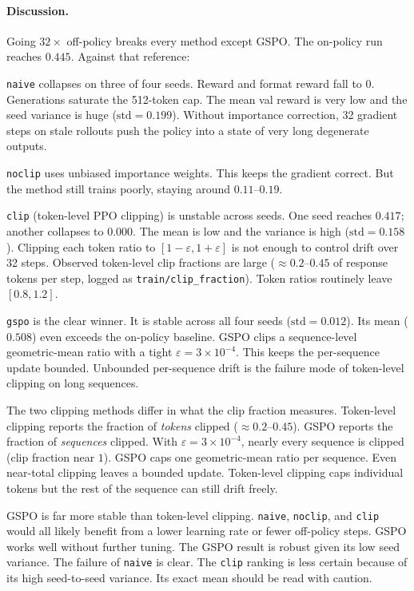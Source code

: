 \documentclass[11pt]{article}
\newcommand{\std}{\mathrm{std}}
\begin{document}
\paragraph{Discussion.}
Going $32\times$ off-policy breaks every method except GSPO. The on-policy run
reaches $0.445$. Against that reference:

\texttt{naive} collapses on three of four seeds. Reward and format reward fall
to $0$. Generations saturate the 512-token cap. The mean val reward is very low
and the seed variance is huge ($\std=0.199$). Without importance correction,
32 gradient steps on stale rollouts push the policy into a state of very long
degenerate outputs.

\texttt{noclip} uses unbiased importance weights. This keeps the gradient
correct. But the method still trains poorly, staying around $0.11$--$0.19$.

\texttt{clip} (token-level PPO clipping) is unstable across seeds. One seed
reaches $0.417$; another collapses to $0.000$. The mean is low and the variance
is high ($\std=0.158$). Clipping each token ratio to $[1-\varepsilon,1+\varepsilon]$
is not enough to control drift over 32 steps. Observed token-level clip
fractions are large ($\approx 0.2$--$0.45$ of response tokens per step, logged
as \texttt{train/clip\_fraction}). Token ratios routinely leave $[0.8,1.2]$.

\texttt{gspo} is the clear winner. It is stable across all four seeds
($\std=0.012$). Its mean ($0.508$) even exceeds the on-policy baseline. GSPO
clips a sequence-level geometric-mean ratio with a tight
$\varepsilon=3\!\times\!10^{-4}$. This keeps the per-sequence update bounded.
Unbounded per-sequence drift is the failure mode of token-level clipping on
long sequences.

The two clipping methods differ in what the clip fraction measures. Token-level
clipping reports the fraction of \emph{tokens} clipped ($\approx 0.2$--$0.45$).
GSPO reports the fraction of \emph{sequences} clipped. With
$\varepsilon=3\!\times\!10^{-4}$, nearly every sequence is clipped (clip
fraction near $1$). GSPO caps one geometric-mean ratio per sequence. Even
near-total clipping leaves a bounded update. Token-level clipping caps
individual tokens but the rest of the sequence can still drift freely.

GSPO is far more stable than token-level clipping. \texttt{naive},
\texttt{noclip}, and \texttt{clip} would all likely benefit from a lower
learning rate or fewer off-policy steps. GSPO works well without further tuning.
The GSPO result is robust given its low seed variance. The failure of
\texttt{naive} is clear. The \texttt{clip} ranking is less certain because of
its high seed-to-seed variance. Its exact mean should be read with caution.
\end{document}
